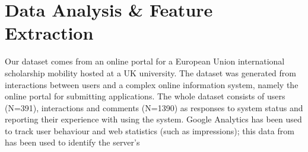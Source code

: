 \documentclass[graybox]{svmult}
\begin{document}
\section{Data Analysis \& Feature Extraction}\label{dataanalysis}

Our dataset comes from an online portal for a European Union
international scholarship mobility hosted at a UK university. The
dataset was generated from interactions between users and a complex
online information system, namely the online portal for submitting
applications. The whole dataset consists of users (N=391),
interactions and comments (N=1390) as responses to system status and
reporting their experience with using the system. Google Analytics has
been used to track user behaviour and web statistics (such as
impressions); this data from has been used to identify the server's
\end{document}
